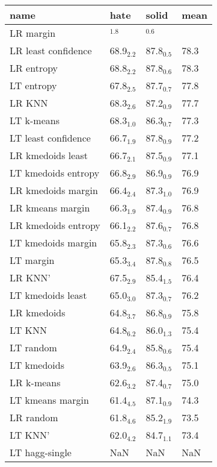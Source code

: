 \begin{tabular}{llll}
\toprule
               name &                hate &               solid &        mean \\
\midrule
          LR margin & \bftab 69.1$_{1.8}$ & \bftab 88.3$_{0.6}$ & \bftab 78.7 \\
LR least confidence &        68.9$_{2.2}$ &        87.8$_{0.5}$ &        78.3 \\
         LR entropy &        68.8$_{2.2}$ &        87.8$_{0.6}$ &        78.3 \\
         LT entropy &        67.8$_{2.5}$ &        87.7$_{0.7}$ &        77.8 \\
             LR KNN &        68.3$_{2.6}$ &        87.2$_{0.9}$ &        77.7 \\
         LT k-means &        68.3$_{1.0}$ &        86.3$_{0.7}$ &        77.3 \\
LT least confidence &        66.7$_{1.9}$ &        87.8$_{0.9}$ &        77.2 \\
  LR kmedoids least &        66.7$_{2.1}$ &        87.5$_{0.9}$ &        77.1 \\
LT kmedoids entropy &        66.8$_{2.9}$ &        86.9$_{0.9}$ &        76.9 \\
 LR kmedoids margin &        66.4$_{2.4}$ &        87.3$_{1.0}$ &        76.9 \\
   LR kmeans margin &        66.3$_{1.9}$ &        87.4$_{0.9}$ &        76.8 \\
LR kmedoids entropy &        66.1$_{2.2}$ &        87.6$_{0.7}$ &        76.8 \\
 LT kmedoids margin &        65.8$_{2.3}$ &        87.3$_{0.6}$ &        76.6 \\
          LT margin &        65.3$_{3.4}$ &        87.8$_{0.8}$ &        76.5 \\
            LR KNN' &        67.5$_{2.9}$ &        85.4$_{1.5}$ &        76.4 \\
  LT kmedoids least &        65.0$_{3.0}$ &        87.3$_{0.7}$ &        76.2 \\
        LR kmedoids &        64.8$_{3.7}$ &        86.8$_{0.9}$ &        75.8 \\
             LT KNN &        64.8$_{6.2}$ &        86.0$_{1.3}$ &        75.4 \\
          LT random &        64.9$_{2.4}$ &        85.8$_{0.6}$ &        75.4 \\
        LT kmedoids &        63.9$_{2.6}$ &        86.3$_{0.5}$ &        75.1 \\
         LR k-means &        62.6$_{3.2}$ &        87.4$_{0.7}$ &        75.0 \\
   LT kmeans margin &        61.4$_{4.5}$ &        87.1$_{0.9}$ &        74.3 \\
          LR random &        61.8$_{4.6}$ &        85.2$_{1.9}$ &        73.5 \\
            LT KNN' &        62.0$_{4.2}$ &        84.7$_{1.1}$ &        73.4 \\
     LT hagg-single &                 NaN &                 NaN &         NaN \\
\bottomrule
\end{tabular}

